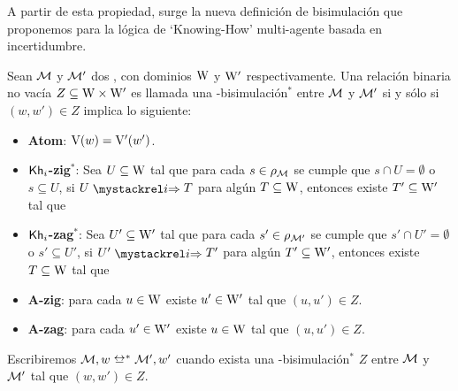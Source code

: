 A partir de esta propiedad, surge la nueva definición de bisimulación que proponemos para la lógica de `Knowing-How' multi-agente basada en 
incertidumbre.

\begin{definicion}\label{def:bisim_redefinition}
    Sean $\mathcal{M}$ y $\mathcal{M}'$ dos \ultss, con dominios $\mathrm{W}$ y $\mathrm{W}'$ respectivamente.
    Una relación binaria no vacía $Z \subseteq \mathrm{W} \times \mathrm{W}'$ es llamada una \KHilogic-bisimulación$^*$ entre $\mathcal{M}$ y 
    $\mathcal{M}'$ si y sólo si $(w,w') \in Z$ implica lo siguiente:
    \begin{itemize}
        \item \textbf{Atom}: $\mathrm{V}(w)=\mathrm{V}'(w')$.

        \item \textbf{$\mathsf{Kh}_i$-zig$^*$}: Sea $U \subseteq \mathrm{W}$ tal que para cada $s \in \rho_{\mathcal{M}}$ se cumple que $s \cap U = \emptyset$ o $s \subseteq U$, si $U \ultsExecAgi T$ para algún $T \subseteq \mathrm{W}$, entonces existe $T' \subseteq \mathrm{W}'$ tal que
        \begin{multicols}{2}
        \end{multicols}
        
        \item \textbf{$\mathsf{Kh}_i$-zag$^*$}: Sea $U' \subseteq \mathrm{W}'$ tal que para cada $s' \in \rho_{\mathcal{M}'}$ se cumple que $s' \cap U' = \emptyset$ o $s' \subseteq U'$, si $U' \ultsExecAgi T'$ para algún $T' \subseteq \mathrm{W}'$, entonces existe $T \subseteq \mathrm{W}$ tal que
        \begin{multicols}{2}
        \end{multicols}

        \item \textbf{A-zig}: para cada $u \in \mathrm{W}$ existe $u' \in \mathrm{W}'$ tal que $(u,u') \in Z$.

        \item \textbf{A-zag}: para cada $u' \in \mathrm{W}'$ existe $u \in \mathrm{W}$ tal que $(u,u') \in Z$.
    \end{itemize} 

    Escribiremos $\modults,w \bisim^* \modults',w'$ cuando exista una \KHilogic-bisimulación$^*$ $Z$ entre
    $\mathcal{M}$ y $\mathcal{M}'$ tal que $(w,w') \in Z$.
\end{definicion}

